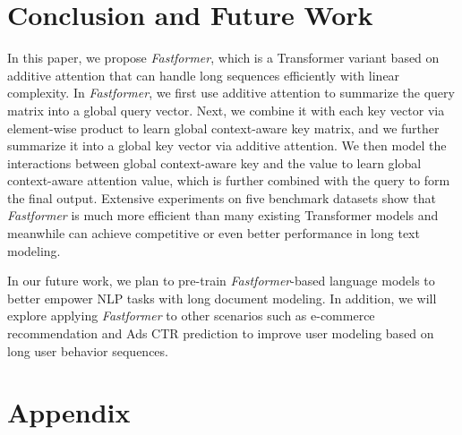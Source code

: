\documentclass[11pt,a4paper]{article}
\begin{document}
\begin{table}[h]
\centering
{}
  \caption{Accuracy, memory cost and inference speed comparison.}\label{cvr}

\end{table}

 \section{Conclusion and Future Work}\label{sec:Conclusion}


In this paper, we propose \textit{Fastformer}, which is a  Transformer variant based on additive attention that can handle long sequences efficiently with linear complexity.
In \textit{Fastformer}, we first use additive attention to summarize the query matrix into a global query vector.
Next, we combine it with each key vector via element-wise product to learn global context-aware key matrix, and we further summarize it into a global key vector via additive attention.
We then model the interactions between global context-aware key and the value to learn global context-aware attention value, which is further combined with the query to form the final output.
Extensive experiments on five benchmark datasets show that \textit{Fastformer} is much more efficient than many existing Transformer models and meanwhile can achieve competitive or even better performance in long text modeling.

In our future work, we plan to pre-train \textit{Fastformer}-based language models to better empower NLP tasks with long document modeling.
In addition, we will explore applying \textit{Fastformer} to other scenarios such as e-commerce recommendation and Ads CTR prediction to improve user modeling based on long user behavior sequences. 







\appendix 


\section{Appendix}
\end{document}
